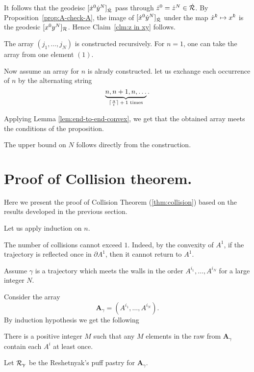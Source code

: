 It follows that the geodeisc $[\dot x^0\dot y^N]_{\dot{\mathcal{R}}}$ pass through $\dot z^0=\dot z^N\in\dot{\spc{R}}$.
By Proposition~\ref{prop:A-check-A}, 
the image of $[\dot x^0\dot y^N]_{\dot{\mathcal{R}}}$ 
under the map $\dot x^\kay\mapsto x^\kay$
is the geodesic $[x^0 y^N]_{\mathcal{R}}$.
Hence Claim~\ref{clm:z in xy} follows.
\qeds

The array $(j_1,\dots,j_N)$ is constructed recursively.
For $n=1$, one can take the array from one element $(1)$.

Now assume an array for $n$ is alrady constructed.
let us exchange each occurrence of $n$ by the alternating string 
\[\underbrace{n,n+1,n,\dots}_{\text{$\lceil\tfrac\pi\eps\rceil+1$ times}}.\]

Applying Lemma \ref{lem:end-to-end-convex}, 
we get that the obtained array meets the conditions of the proposition.

The upper bound on $N$ follows directly from the construction.
\qeds



\section{Proof of Collision theorem.}\label{sec:proof-of-collision}

Here we present the proof of Collision Theorem (\ref{thm:collision})
based on the results developed in the previous section.

Let us apply induction on $n$.

The number of collisions cannot exceed $1$.  
Indeed, by the convexity of $A^1$,
if the trajectory is reflected once in $\partial A^1$, 
then it cannot return to $A^1$. 

Assume $\gamma$ is a trajectory which meets the walls in the order $A^{i_1},\dots,A^{i_N}$ for a large integer $N$.

Consider the array 
\[\bm{A}_\gamma=(A^{i_1},\dots,A^{i_N}).\]
By induction hypothesis we get the following

\begin{clm}{}\label{clm:collision-induction hypothesis}
There is a positive integer $M$ 
such that any $M$ elements in the raw from  $\bm{A}_\gamma$ contain each $A^i$ at least once.
\end{clm}

Let $\mathcal{R}_\upgamma$ be  the  Reshetnyak's puff pastry for  $\bm{A}_\gamma$.


